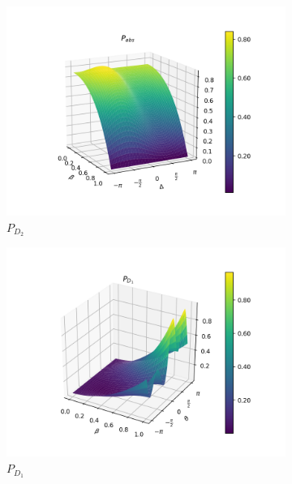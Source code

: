 \documentclass{book}
\begin{document}
\begin{figure}[H]
\begin{subfigure}[b]{0.30\linewidth}
\includegraphics[width=\linewidth]{images/pabs_3_pi4.png}
\caption{$P_{D_{2}}$ }
\label{fig:BS1}
\end{subfigure}
\begin{subfigure}[b]{0.30\linewidth}
\includegraphics[width=\linewidth]{images/pd1_5_pi4.png}
\caption{$P_{D_{1}}$ }
\label{fig:BS1}
\end{subfigure}
\begin{subfigure}[b]{0.30\linewidth}

\end{subfigure}
\end{figure}
\end{document}
